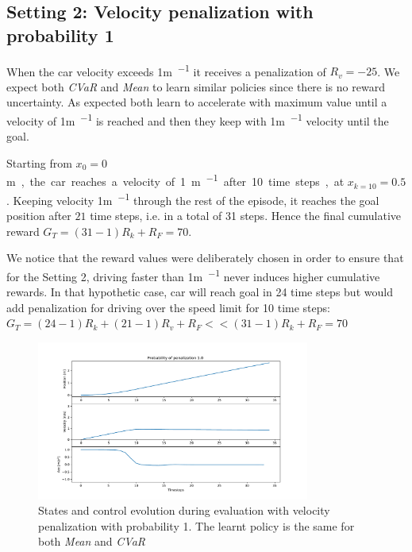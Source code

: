 \subsection{Setting 2: Velocity penalization with probability 1 }
When the car velocity exceeds 1\si{\metre\per\ts} it receives a penalization of $R_v=-25$.
We expect both \textit{CVaR} and \textit{Mean} to learn similar policies 
since there is no reward uncertainty. As expected
both learn to accelerate with maximum value
until a velocity of 1\si{\metre\per\ts} is reached
and then they keep with 1\si{\metre\per\ts} velocity until the goal.

Starting from $x_0=0$\si\metre, the car reaches a velocity of 1\si{\metre\per\ts} after 
10 time steps, at $x_{k=10}=0.5$. Keeping velocity 1\si{\metre\per\ts} through 
the rest of the episode, it reaches the goal position after $21$ time steps, i.e. in a total of 31 steps.
Hence the final cumulative reward $G_T= (31-1) R_{k} + R_{F}=70$.

We notice that the reward values were deliberately chosen in order to ensure that for the Setting 2,
driving faster than 1\si{\metre\per\ts} never induces higher cumulative
rewards. In that hypothetic case, car will reach goal in 24 time steps
but would add penalization for driving over the speed limit for 10 time steps:\\
$G_T= (24-1)R_{k} + (21-1)R_{v} + R_{F} << (31-1) R_{k} + R_{F}=70$

\begin{figure}[ht]
        \centering
        \includegraphics[width=0.8\textwidth]{images/Car/CVAR/Trajectory_penal.pdf}
        \caption{States and control evolution during evaluation with velocity penalization
        with probability 1.
        The learnt policy is the same for both \textit{Mean} and \textit{CVaR}}
        \label{fig:traj1_penal1}
    
\end{figure}

